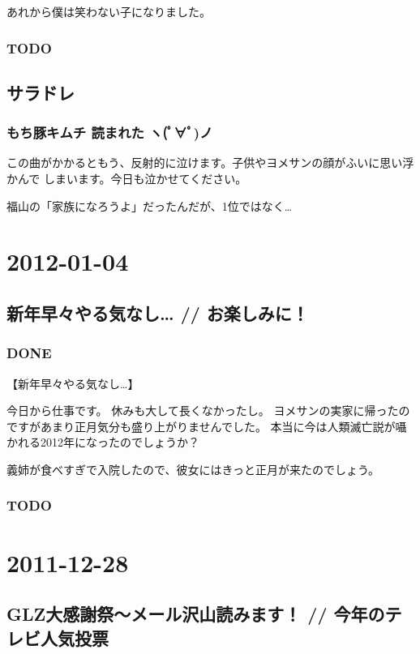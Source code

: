 \documentclass[11pt]{article}
\begin{document}
あれから僕は笑わない子になりました。
\subsubsection{\textbf{TODO}}
\label{sec-13_1_3}
\subsection{サラドレ}
\label{sec-13_2}
\subsubsection{もち豚キムチ 読まれた ヽ(ﾟ∀ﾟ)ノ}
\label{sec-13_2_1}

この曲がかかるともう、反射的に泣けます。子供やヨメサンの顔がふいに思い浮かんで
しまいます。今日も泣かせてください。

福山の「家族になろうよ」だったんだが、1位ではなく…
\section{2012-01-04}
\label{sec-14}
\subsection{新年早々やる気なし… // お楽しみに！}
\label{sec-14_1}
\subsubsection{\textbf{DONE}}
\label{sec-14_1_1}

【新年早々やる気なし…】

今日から仕事です。
休みも大して長くなかったし。
ヨメサンの実家に帰ったのですがあまり正月気分も盛り上がりませんでした。
本当に今は人類滅亡説が囁かれる2012年になったのでしょうか？

義姉が食べすぎで入院したので、彼女にはきっと正月が来たのでしょう。
\subsubsection{\textbf{TODO}}
\label{sec-14_1_2}
\section{2011-12-28}
\label{sec-15}
\subsection{GLZ大感謝祭～メール沢山読みます！ // 今年のテレビ人気投票}
\label{sec-15_1}
\subsubsection{}
\end{document}
